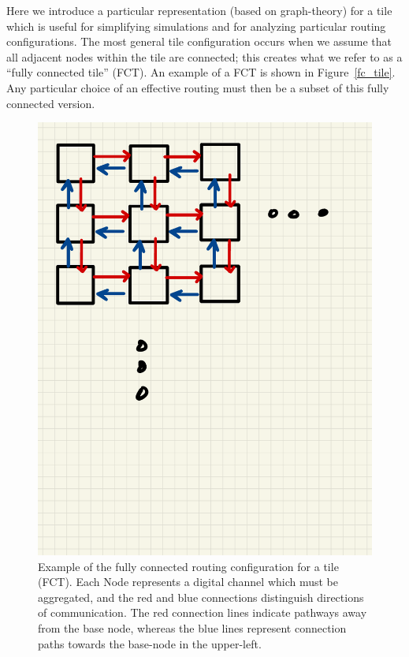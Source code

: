 Here we introduce a particular representation (based on graph-theory) for a tile which is useful for simplifying simulations and for analyzing particular routing configurations.
The most general tile configuration occurs when we assume that all adjacent nodes within the tile are connected; this creates what we refer to as a ``fully connected tile'' (FCT).
An example of a FCT is shown in Figure~\ref{fc_tile}.
Any particular choice of an effective routing must then be a subset of this fully connected version.

\begin{figure}[]
\centering
\includegraphics[width=\textwidth]{images/Notes.pdf}
\caption{Example of the fully connected routing configuration for a tile (FCT). Each Node represents a digital channel which must be aggregated, and the red and blue connections distinguish directions of communication. The red connection lines indicate pathways away from the base node, whereas the blue lines represent connection paths towards the base-node in the upper-left.}
\end{figure}~\label{fig:fc_tile}

